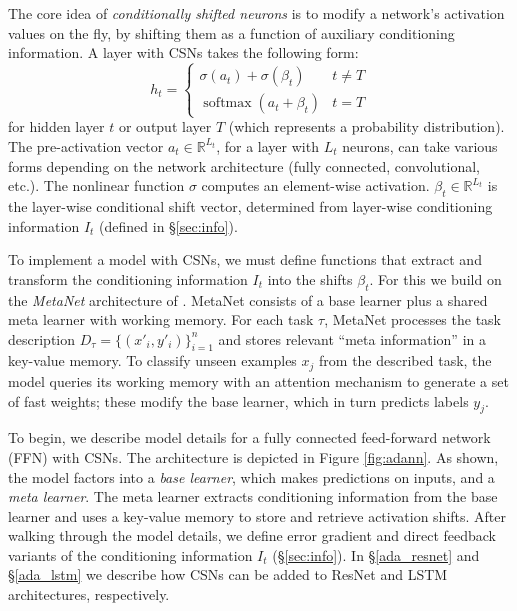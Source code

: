 \documentclass{article}
\DeclareMathOperator*{\softmax}{softmax}
\begin{document}
The core idea of \textit{conditionally shifted neurons} is to modify a network's activation values on the fly, by shifting them as a function of auxiliary conditioning information.
A layer with CSNs takes the following form:
\begin{equation}
h_t = \begin{cases}
    \label{eq:adaN_t}
    \sigma (a_t) + \sigma(\beta_t) & t \neq T \\
\softmax(a_{t} + \beta_{t}) & t = T
\end{cases}
\end{equation}
for hidden layer $t$ or output layer $T$ (which represents a probability distribution). The pre-activation vector $a_t \in \mathbb{R}^{L_t}$, for a layer with $L_t$ neurons, can take various forms depending on the network architecture (fully connected, convolutional, etc.).
The nonlinear function $\sigma$ computes an element-wise activation.
$\beta_t \in \mathbb{R}^{L_t}$ is the layer-wise conditional shift vector, determined from layer-wise conditioning information $I_t$ (defined in \S\ref{sec:info}).

To implement a model with CSNs, we must define functions that extract and transform the conditioning information $I_t$ into the shifts $\beta_t$.
For this we build on the \emph{MetaNet} architecture of \citet{pmlr-v70-munkhdalai17a}.
MetaNet consists of a base learner plus a shared meta learner with working memory. For each task $\tau$, MetaNet processes the task description $D_{\tau} = \lbrace (x'_i,y'_i) \rbrace^n_{i=1}$ and stores relevant ``meta information'' in a key-value memory.
To classify unseen examples $x_j$ from the described task, the model queries its working memory with an attention mechanism to generate a set of fast weights; these modify the base learner, which in turn predicts labels $y_j$.

To begin, we describe model details for a fully connected feed-forward network (FFN) with CSNs.
The architecture is depicted in Figure \ref{fig:adann}.
As shown, the model factors into a \emph{base learner}, which makes predictions on inputs, and a \emph{meta learner}. The meta learner extracts conditioning information from the base learner and uses a key-value memory to store and retrieve activation shifts.
After walking through the model details, we define error gradient and direct feedback variants of the conditioning information $I_t$ (\S\ref{sec:info}).
In \S\ref{ada_resnet} and \S\ref{ada_lstm} we describe how CSNs can be added to ResNet and LSTM architectures, respectively.
\end{document}
